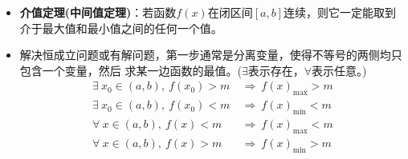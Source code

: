 \begin{itemize}[leftmargin=\inteval{\myitemleftmargin}pt,itemsep=
   \inteval{\myitemitempsep}pt,topsep=\inteval{\myitemtopsep}pt]
\item \textbf{介值定理(中间值定理)}：若函数$ f(x) $在闭区间$ [a,b] $连续，则它一定能取到介于最大值和最小值之间的任何一个值。

\item 解决恒成立问题或有解问题，第一步通常是分离变量，使得不等号的两侧均只包含一个变量，然后
求某一边函数的最值。($ \exists $表示存在，$ \forall $表示任意。)
\begin{align*}
    \exists\ x_0\in(a,b),\ f(x_0)>m &\ \Rightarrow \ f(x)_{\max} >m \\
    \exists\ x_0\in(a,b),\ f(x_0)<m &\ \Rightarrow \ f(x)_{\min} <m \\
    \forall\ x\in(a,b),\ f(x)<m &\ \Rightarrow \ f(x)_{\max} <m \\
    \forall\ x\in(a,b),\ f(x)>m &\ \Rightarrow \ f(x)_{\min} >m 
\end{align*}

\end{itemize}

